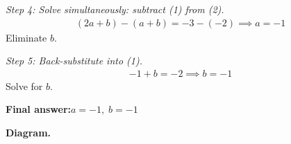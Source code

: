 \documentclass[11pt]{article}
\begin{document}
\textit{Step 4: Solve simultaneously: subtract (1) from (2).}
\[\begin{gathered}
(2a + b) - (a + b) = -3 - (-2) \implies a = -1
\end{gathered}\]
Eliminate \( b \).

\textit{Step 5: Back-substitute into (1).}
\[\begin{gathered}
-1 + b = -2 \implies b = -1
\end{gathered}\]
Solve for \( b \).

\begin{answerbox}
\textbf{Final answer:}\quad \(\displaystyle  a = -1,\; b = -1 \)
\end{answerbox}
\textbf{Diagram.}

\begin{center}
\end{center}
\end{document}
